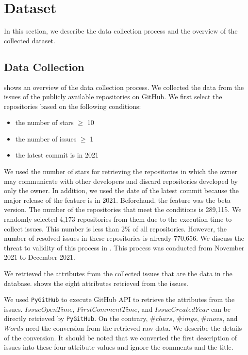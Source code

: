 \section{Dataset}
\label{sec:dataset}

In this section, we describe the data collection process and 
the overview of the collected dataset. 



\subsection{Data Collection}
 shows
an overview of the data collection process.
We collected the data from the issues of 
the publicly available repositories on GitHub. 
We first select the repositories based on the following conditions:
\begin{itemize}
	\item the number of stars $\geq$ 10
	\item the number of issues $\geq$ 1
	\item the latest commit is in 2021
\end{itemize}
We used the number of stars for retrieving the repositories 
in which the owner may communicate with other developers and 
discard repositories developed by only the owner. 
In addition, we used the date of the latest commit 
because the major release of the feature is in 2021. 
Beforehand, the feature was the beta version. 
The number of the repositories that meet 
the conditions is 289,115. 
We randomly selected 4,173 repositories from them 
due to the execution time to collect issues. 
This number is less than 2\% of all repositories. 
However, the number of resolved issues 
in these repositories is already 770,656. 
We discuss the threat to validity of 
this process in . 
This process was conducted from November 2021 to December 2021.



We retrieved the attributes from the collected issues 
that are the data in the database. 
 shows the eight attributes 
retrieved from the issues. 

We used \texttt{PyGitHub} to execute GitHub API 
to retrieve the attributes from the issues. 
$IssueOpenTime$, $FirstCommentTime$,
and $IssueCreatedYear$ can be directly
retrieved by \texttt{PyGitHub}.
On the contrary,
$\#chars$, $\#imgs$, $\#movs$, and $Words$
need the conversion from the retrieved raw data.
We describe the details of the conversion. 
It should be noted that we converted the first description of 
issues into these four attribute values and 
ignore the comments and the title.

